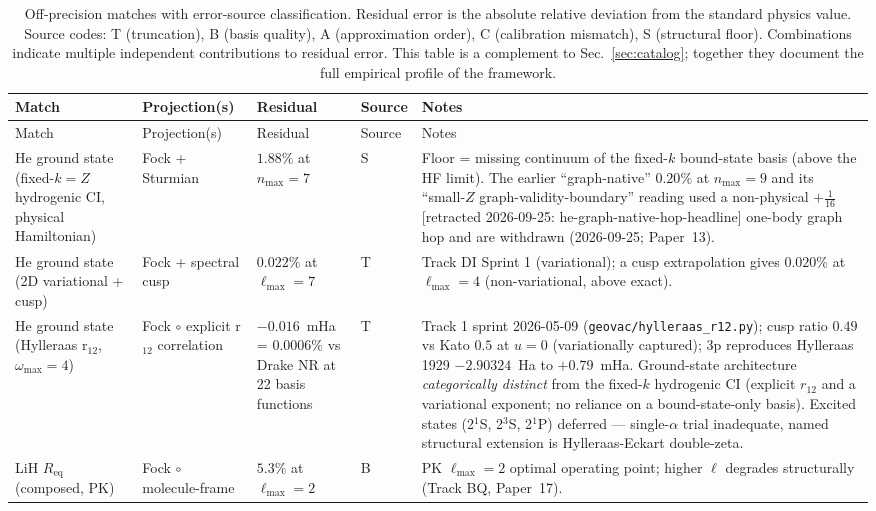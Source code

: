 \documentclass[11pt]{article}
\begin{document}
{\small
\begin{longtable}{p{3.8cm} p{2.5cm} p{1.5cm} p{1.4cm} p{4.5cm}}
\caption{Off-precision matches with error-source classification.
Residual error is the absolute relative deviation from the standard
physics value.  Source codes: T (truncation), B (basis quality),
A (approximation order), C (calibration mismatch), S (structural
floor).  Combinations indicate multiple independent contributions
to residual error.  This table is a complement to
Sec.~\ref{sec:catalog}; together they document the full empirical
profile of the framework.}
\label{tab:offprecision}\\
\toprule
Match & Projection(s) & Residual & Source & Notes \\
\midrule
\endfirsthead
\toprule
Match & Projection(s) & Residual & Source & Notes \\
\midrule
\endhead
He ground state (fixed-$k=Z$ hydrogenic CI, physical Hamiltonian) & Fock + Sturmian &
$1.88\%$ at $n_\text{max}=7$ & S & Floor = missing continuum of the
fixed-$k$ bound-state basis (above the HF limit).  The earlier
``graph-native'' $0.20\%$ at $n_\text{max}=9$ and its ``small-$Z$
graph-validity-boundary'' reading used a non-physical $+\tfrac{1}{16}$ [retracted 2026-09-25: he-graph-native-hop-headline]
one-body graph hop and are withdrawn (2026-09-25; Paper~13). \\
He ground state (2D variational + cusp) & Fock + spectral cusp &
$0.022\%$ at $\ell_\text{max}=7$ & T & Track DI Sprint 1 (variational); a cusp
extrapolation gives $0.020\%$ at $\ell_\text{max}=4$ (non-variational, above exact). \\
He ground state (Hylleraas r$_{12}$, $\omega_{\max}=4$) & Fock $\circ$
explicit r$_{12}$ correlation
& $-0.016$~mHa = $0.0006\%$ vs Drake NR at 22 basis functions & T &
Track 1 sprint 2026-05-09 (\texttt{geovac/hylleraas\_r12.py}); cusp ratio
$0.49$ vs Kato $0.5$ at $u=0$ (variationally captured); 3p reproduces
Hylleraas 1929 $-2.90324$~Ha to $+0.79$~mHa.  Ground-state architecture
\emph{categorically distinct} from the fixed-$k$ hydrogenic CI (explicit
$r_{12}$ and a variational exponent; no reliance on a bound-state-only
basis).  Excited states (2$^1$S, 2$^3$S, 2$^1$P) deferred --- single-$\alpha$
trial inadequate, named structural extension is Hylleraas-Eckart
double-zeta. \\
LiH $R_{\text{eq}}$ (composed, PK) & Fock $\circ$ molecule-frame
& $5.3\%$ at $\ell_\text{max}=2$ & B & PK $\ell_\text{max}=2$ optimal
operating point; higher $\ell$ degrades structurally
(Track BQ, Paper~17). \\

\end{longtable}}
\end{document}

